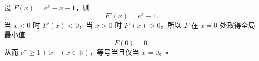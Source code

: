 设 $F(x)=e^x-x-1$，则
\[
F'(x)=e^x-1.
\]
当 $x<0$ 时 $F'(x)<0$，当 $x>0$ 时 $F'(x)>0$。所以 $F$ 在 $x=0$ 处取得全局最小值
\[
F(0)=0.
\]
从而 $\boxed{e^x\ge 1+x\quad(x\in\mathbb R)}$，等号当且仅当 $x=0$。$\square$
